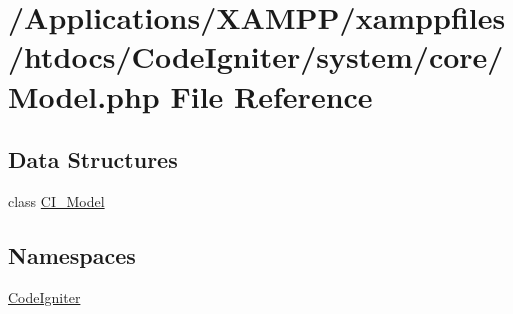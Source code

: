\hypertarget{_model_8php}{}\section{/\+Applications/\+X\+A\+M\+P\+P/xamppfiles/htdocs/\+Code\+Igniter/system/core/\+Model.php File Reference}
\label{_model_8php}
\subsection*{Data Structures}
\begin{DoxyCompactItemize}
\item 
class \mbox{\hyperlink{class_c_i___model}{C\+I\+\_\+\+Model}}
\end{DoxyCompactItemize}
\subsection*{Namespaces}
\begin{DoxyCompactItemize}
\item 
 \mbox{\hyperlink{namespace_code_igniter}{Code\+Igniter}}
\end{DoxyCompactItemize}
